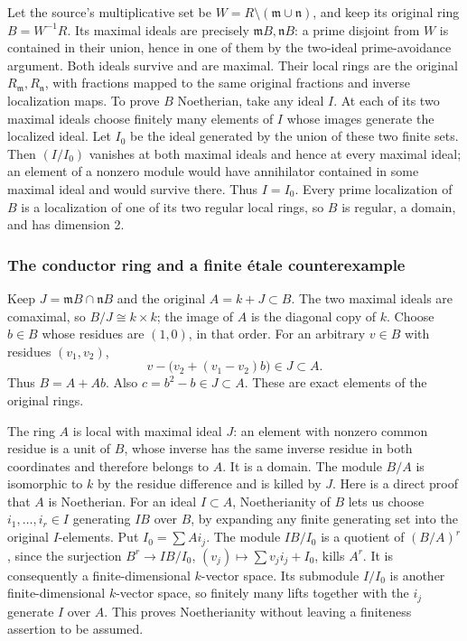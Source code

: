 Let the source's multiplicative set be \(W=R\setminus(\mathfrak m\cup\mathfrak n)\), and keep its original ring \(B=W^{-1}R\). Its maximal ideals are precisely \(\mathfrak mB,\mathfrak nB\): a prime disjoint from \(W\) is contained in their union, hence in one of them by the two-ideal prime-avoidance argument. Both ideals survive and are maximal. Their local rings are the original \(R_{\mathfrak m},R_{\mathfrak n}\), with fractions mapped to the same original fractions and inverse localization maps. To prove \(B\) Noetherian, take any ideal \(I\). At each of its two maximal ideals choose finitely many elements of \(I\) whose images generate the localized ideal. Let \(I_0\) be the ideal generated by the union of these two finite sets. Then \((I/I_0)\) vanishes at both maximal ideals and hence at every maximal ideal; an element of a nonzero module would have annihilator contained in some maximal ideal and would survive there. Thus \(I=I_0\). Every prime localization of \(B\) is a localization of one of its two regular local rings, so \(B\) is regular, a domain, and has dimension 2.

\subsubsection{The conductor ring and a finite étale counterexample}\label{the-conductor-ring-and-a-finite-uxe9tale-counterexample}

Keep \(J=\mathfrak mB\cap\mathfrak nB\) and the original \(A=k+J\subset B\). The two maximal ideals are comaximal, so \(B/J\cong k\times k\); the image of \(A\) is the diagonal copy of \(k\). Choose \(b\in B\) whose residues are \((1,0)\), in that order. For an arbitrary \(v\in B\) with residues \((v_1,v_2)\), \[
 v-\bigl(v_2+(v_1-v_2)b\bigr)\in J\subset A.
\] Thus \(B=A+Ab\). Also \(c=b^2-b\in J\subset A\). These are exact elements of the original rings.

The ring \(A\) is local with maximal ideal \(J\): an element with nonzero common residue is a unit of \(B\), whose inverse has the same inverse residue in both coordinates and therefore belongs to \(A\). It is a domain. The module \(B/A\) is isomorphic to \(k\) by the residue difference and is killed by \(J\). Here is a direct proof that \(A\) is Noetherian. For an ideal \(I\subset A\), Noetherianity of \(B\) lets us choose \(i_1,\ldots,i_r\in I\) generating \(IB\) over \(B\), by expanding any finite generating set into the original \(I\)-elements. Put \(I_0=\sum Ai_j\). The module \(IB/I_0\) is a quotient of \((B/A)^r\), since the surjection \(B^r\to IB/I_0\), \((v_j)\mapsto\sum v_ji_j+I_0\), kills \(A^r\). It is consequently a finite-dimensional \(k\)-vector space. Its submodule \(I/I_0\) is another finite-dimensional \(k\)-vector space, so finitely many lifts together with the \(i_j\) generate \(I\) over \(A\). This proves Noetherianity without leaving a finiteness assertion to be assumed.

